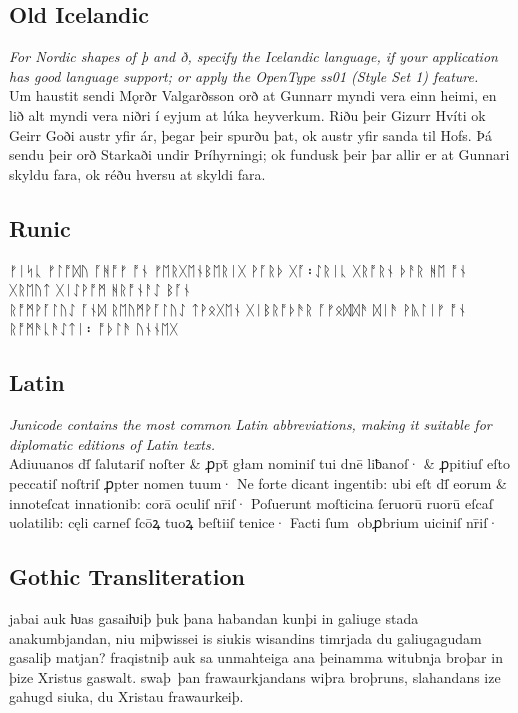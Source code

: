 \documentclass[a4paper]{article}
\begin{document}
\subsection*{Old Icelandic}

{\small\itshape For Nordic shapes of þ and ð, specify the Icelandic
language, if your application has good language support; or apply the OpenType
ss01 (Style Set 1) feature.}\\[1ex]
Um haustit sendi Mǫrðr Valgarðsson orð at Gunnarr myndi vera einn heimi, en
lið alt myndi vera niðri í eyjum at lúka heyverkum. Riðu þeir Gizurr Hvíti ok
Geirr Goði austr yfir ár, þegar þeir spurðu þat, ok austr yfir sanda til Hofs.
Þá sendu þeir orð Starkaði undir Þríhyrningi; ok fundusk þeir þar allir er at
Gunnari skyldu fara, ok réðu hversu at skyldi fara.

\subsection*{Runic}
ᚠᛁᛋᚳ ᚠᛚᚩᛞᚢ ᚪᚻᚩᚠ ᚩᚾ ᚠᛖᚱᚷᛖᚾᛒᛖᚱᛁᚷ ᚹᚪᚱᚦ ᚷᚪ᛬ᛇᚱᛁᚳ ᚷᚱᚩᚱᚾ ᚦᚨᚱ ᚻᛖ ᚩᚾ ᚷᚱᛖᚢᛏ ᚷᛁᛇᚹᚩᛗ
ᚻᚱᚩᚾᚨᛇ ᛒᚪᚾ\\
ᚱᚩᛗᚹᚪᛚᚢᛇ ᚪᚾᛞ ᚱᛖᚢᛗᚹᚪᛚᚢᛇ ᛏᚹᛟᚷᛖᚾ ᚷᛁᛒᚱᚩᚦᚫᚱ ᚪᚠᛟᛞᛞᚫ ᛞᛁᚫ ᚹᚣᛚᛁᚠ ᚩᚾ ᚱᚩᛗᚫ\linebreak[0]ᚳᚫᛇᛏᛁ᛬
ᚩᚦᛚᚫ ᚢᚾᚾᛖᚷ

\subsection*{Latin}

{\small\itshape Junicode contains the most common Latin abbreviations,
  making it suitable for diplomatic editions of Latin texts.}\\[1ex]
{Adiuuanos dſ̄ ſalutariſ noſter \&
 ꝓpt̄ głam nominiſ tui dnē liƀanoſ· \& ꝓpitiuſ eſto peccatiſ noſtriſ
 ꝓpter nomen tuum· Ne forte dicant ingentib: ubi eſt dſ̄ eorum \&
  innoteſcat innationib: corā oculiſ nr̄iſ· Poſuerunt moſticina
  ſeruorū ruorū eſcaſ uolatilib: cęli carneſ ſcōꝝ tuoꝝ beſtiiſ tenice·
  Facti ſum obꝓbrium uiciniſ nr̄iſ·}

\subsection*{Gothic Transliteration}

jabai auk ƕas gasaiƕiþ þuk þana habandan kunþi in galiuge stada
anakumbjandan, niu miþwissei is siukis wisandins timrjada du
galiugagudam gasaliþ matjan?  fraqistniþ auk sa unmahteiga ana
þeinamma witubnja broþar in þize Xristus gaswalt.  swaþ~þan
frawaurkjandans wiþra broþruns, slahandans ize gahugd siuka, du
Xristau frawaurkeiþ.
\end{document}
